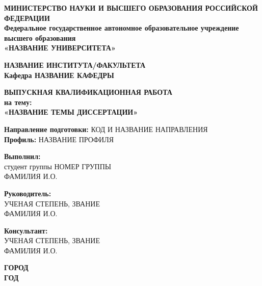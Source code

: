 \begin{titlepage}
    \begin{center}
        \vspace*{1cm}
        
        \textbf{МИНИСТЕРСТВО НАУКИ И ВЫСШЕГО ОБРАЗОВАНИЯ РОССИЙСКОЙ ФЕДЕРАЦИИ}\\
        \textbf{Федеральное государственное автономное образовательное учреждение высшего образования}\\
        \textbf{«НАЗВАНИЕ УНИВЕРСИТЕТА»}
        
        \vspace{1cm}
        
        \textbf{НАЗВАНИЕ ИНСТИТУТА/ФАКУЛЬТЕТА}\\
        \textbf{Кафедра НАЗВАНИЕ КАФЕДРЫ}
        
        \vspace{2cm}
        
        \textbf{ВЫПУСКНАЯ КВАЛИФИКАЦИОННАЯ РАБОТА}\\
        \textbf{на тему:}\\
        \textbf{«НАЗВАНИЕ ТЕМЫ ДИССЕРТАЦИИ»}
        
        \vspace{1cm}
        
        \textbf{Направление подготовки:} КОД И НАЗВАНИЕ НАПРАВЛЕНИЯ\\
        \textbf{Профиль:} НАЗВАНИЕ ПРОФИЛЯ
        
        \vspace{2cm}
        
        \textbf{Выполнил:}\\
        студент группы НОМЕР ГРУППЫ\\
        ФАМИЛИЯ И.О.
        
        \vspace{0.5cm}
        
        \textbf{Руководитель:}\\
        УЧЕНАЯ СТЕПЕНЬ, ЗВАНИЕ\\
        ФАМИЛИЯ И.О.
        
        \vspace{0.5cm}
        
        \textbf{Консультант:}\\
        УЧЕНАЯ СТЕПЕНЬ, ЗВАНИЕ\\
        ФАМИЛИЯ И.О.
        
        \vfill
        
        \textbf{ГОРОД}\\
        \textbf{ГОД}
        
    \end{center}
\end{titlepage}